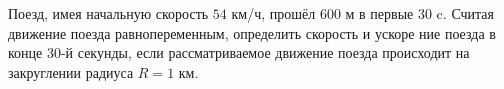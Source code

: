 Поезд, имея начальную скорость $54$ км/ч, прошёл $600$ м в первые $30$ 
c. Считая движение поезда равнопеременным, определить скорость и ускоре
ние поезда в конце $30$-й секунды, если рассматриваемое движение поезда
происходит на закруглении радиуса $R=1$ км.
